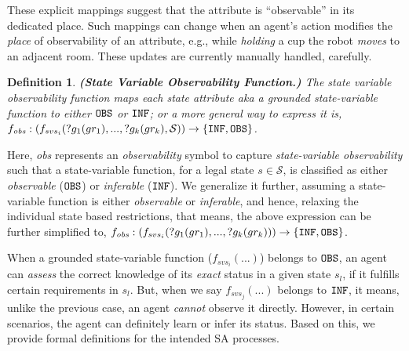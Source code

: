 \documentclass[letterpaper]{article} %
\newtheorem{definition}{Definition}
\begin{document}
These explicit mappings suggest that the attribute is ``observable'' in its dedicated place. Such mappings can change when an agent's action modifies the \textit{place} of observability of an attribute, e.g., 
while \textit{holding} a cup the robot \textit{moves} to an adjacent room. 
These updates are currently manually handled, carefully.

\begin{definition} \label{def:svof}
\textbf{(State Variable Observability Function.)} 
The state variable observability function maps each state attribute {\em aka} a grounded \textit{state-variable function} 
to either $\texttt{OBS}$ or $\texttt{INF}$; or a more general way to express it is, $f_{\textit{obs}}: (f_{svs_i}(?g_1(gr_1),...,?g_k(gr_k),\mathcal{S}
)) \rightarrow 
    \{\texttt{INF}, \texttt{OBS}\}$.
\end{definition}
Here, \textit{obs} represents an \textit{observability} symbol to capture \textit{state-variable observability} such that a state-variable function, for a legal state $s\in\mathcal{S}$, is classified as either \textit{observable} ($\texttt{OBS}$) or \textit{inferable} ($\texttt{INF}$). 
We generalize it further, assuming a state-variable function is either \textit{observable} or \textit{inferable}, and hence, relaxing the individual state based restrictions, that means, the above expression can be further simplified to, 
$f_{\textit{obs}}: (f_{svs_i}(?g_1(gr_1),...,?g_k(gr_k))) \rightarrow \{\texttt{INF}, \texttt{OBS}\}$.

When a grounded state-variable function ($f_{svs_i}(...)$) belongs to $\texttt{OBS}$, an agent can \textit{assess} the correct knowledge of its \textit{exact} status in a given state $s_l$, if it fulfills certain requirements in $s_l$. 
But, when we say $f_{svs_j}(...)$ belongs to $\texttt{INF}$, it means, unlike the previous case, an agent \textit{cannot} observe it directly. 
However, in certain scenarios, the agent can definitely learn or infer its status. Based on this, we provide formal definitions for the intended SA processes.
\end{document}
